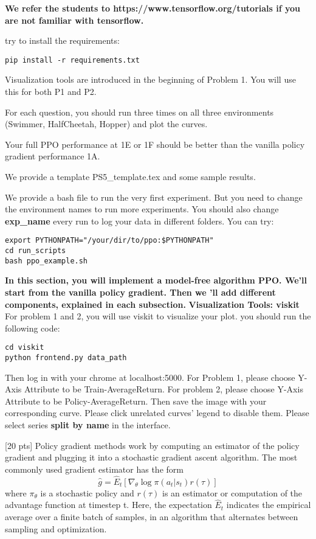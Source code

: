 \documentclass{article}
\begin{document}
{\bf 
We refer the students to https://www.tensorflow.org/tutorials if you are not familiar with tensorflow.

try to install the requirements:
\begin{verbatim}
pip install -r requirements.txt
\end{verbatim}

Visualization tools are introduced in the beginning of Problem 1. You will use this for both P1 and P2. 

For each question, you should run three times on all three environments (Swimmer, HalfCheetah, Hopper) and plot the curves. 

Your full PPO performance at 1E or 1F should be better than the vanilla policy gradient performance 1A. 

We provide a template PS5\_template.tex and some sample results.

We provide a bash file to run the very first experiment. But you need to change the environment names to run more experiments. You should also change {\bf exp\_name} every run to log your data in different folders.  You can try:
\begin{verbatim}
export PYTHONPATH="/your/dir/to/ppo:$PYTHONPATH"
cd run_scripts
bash ppo_example.sh
\end{verbatim}}
{\bf In this section, you will implement a model-free algorithm PPO. We'll  start from the vanilla policy gradient. Then we 'll add different components, explained in each subsection.}
\vskip 0.5in
{\bf Visualization Tools: viskit}
For problem 1 and 2, you will use viskit to visualize your plot. you should run the following code:
\begin{verbatim}
cd viskit
python frontend.py data_path
\end{verbatim}
Then log in with your chrome at localhost:5000. For Problem 1, please choose Y-Axis Attribute to be Train-AverageReturn. For problem 2, please choose Y-Axis Attribute to be Policy-AverageReturn. Then save the image with your corresponding curve. Please click unrelated curves' legend to disable them. Please select series {\bf split by name} in the interface.
\vskip 0.5in

  [20 pts]
 Policy gradient methods work by computing an estimator of the policy gradient and plugging it into a stochastic gradient ascent algorithm. The most commonly used gradient estimator has the form
$$\hat{g} = \hat{E}_t[\nabla_\theta \log \pi(a_t | s_t)r(\tau)] $$
where $\pi_\theta$ is a stochastic policy and $r(\tau)$ is an estimator or computation of the advantage function at timestep t.
Here, the expectation $\hat{E}_t$ indicates the empirical average over a finite batch of samples, in an
algorithm that alternates between sampling and optimization. 
\end{document}
